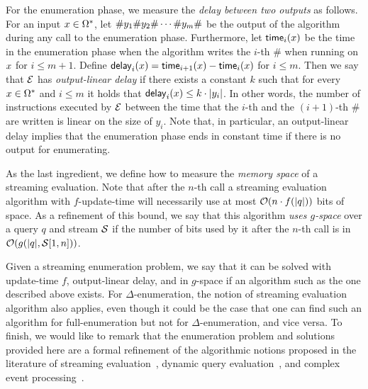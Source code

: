 For the enumeration phase, we measure the \emph{delay between two outputs} as follows. For an input $x\in\Omega^*$, let $\# y_1 \# y_2\#\cdots\#y_m\#$ be the output of the algorithm during any call to the enumeration phase. Furthermore, let $\mathsf{time}_i(x)$ be the time in the enumeration phase when the algorithm writes the $i$-th $\#$ when running on $x$ for $i \leq m+1$. 
Define $\mathsf{delay}_i(x) = \mathsf{time}_{i+1}(x) - \mathsf{time}_{i}(x)$ for $i \leq m$. 
Then we say that $\mathcal{E}$ has {\em output-linear delay} if there exists a constant $k$ such that for every $x\in\Omega^*$ and $i \leq m$ it holds that $\mathsf{delay}_i(x) \leq k \cdot |y_i|$. In other words, the number of instructions executed by $\mathcal{E}$ between the time that the $i$-th and the $(i+1)$-th \# are written is linear on the size of $y_i$.
Note that, in particular, an output-linear delay implies that the enumeration phase ends in constant time if there is no output for enumerating. 

As the last ingredient, we define how to measure the \emph{memory space} of a streaming evaluation. Note that after the $n$-th call a streaming evaluation algorithm with $f$-update-time will necessarily use at most $\mathcal{O}(n\cdot f(|q|))$ bits of space. As a refinement of this bound, we say that this algorithm \emph{uses $g$-space} over a query $q$ and stream $\mathcal{S}$ if the number of bits used by it after the $n$-th call is in $\mathcal{O}(g(|q|, \mathcal{S}[1, n]))$.

Given a streaming enumeration problem, we say that it can be solved with update-time $f$, output-linear delay, and in $g$-space if an algorithm such as the one described above exists. For $\Delta$-enumeration, the notion of streaming evaluation algorithm also applies, even though it could be the case that one can find such an algorithm for full-enumeration but not for $\Delta$-enumeration, and vice versa. 
To finish, we would like to remark that the enumeration problem and solutions provided here are a formal refinement of the algorithmic notions proposed in the literature of streaming evaluation~\cite{GauwinNT09}, dynamic query evaluation~\cite{BerkholzKS17,IdrisUV17}, and complex event processing~\cite{GrezRU19,GrezR20}.